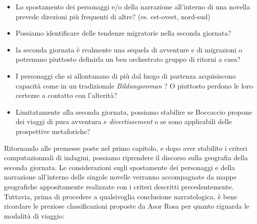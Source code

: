 \begin{itemize}
\tightlist
\item
  Lo spostamento dei personaggi e/o della narrazione all'interno di una
  novella prevede direzioni più frequenti di altre? (es. est-ovest,
  nord-sud)
\item
  Possiamo identificare delle tendenze migratorie nella seconda
  giornata?
\item
  la seconda giornata è realmente una sequela di avventure e di
  migrazioni o potremmo piuttosto definirla un ben orchestrato gruppo di
  ritorni a casa?
\item
  I personaggi che si allontanano di più dal luogo di partenza
  acquisiscono capacità come in un tradizionale \emph{Bildungsroman} ? O
  piuttosto perdono le loro certezze a contatto con l'alterità?
\item
  Limitatamente alla seconda giornata, possiamo stabilire se Boccaccio
  propone dei viaggi di pura avventura e \emph{divertissement} o se sono
  applicabili delle prospettive metaforiche? 
\end{itemize}

Ritornando alle premesse poste nel primo capitolo, e dopo aver stabilito
i criteri computazionnali di indagini, possiamo riprendere il discorso
sulla geografia della seconda giornata. Le considerazioni sugli
spostamente dei personaggi e della narrazione all'interno delle singole
novelle verranno accompagnate da mappe geografiche appositamente
realizzate con i criteri descritti precedentemente. Tuttavia, prima di
procedere a qualsivoglia conclusione narratologica, è bene ricordare le
preziose classificazioni proposte da Asor Rosa
\autocite[p.~550]{asor1992} per quanto riguarda le modalità di viaggio:

